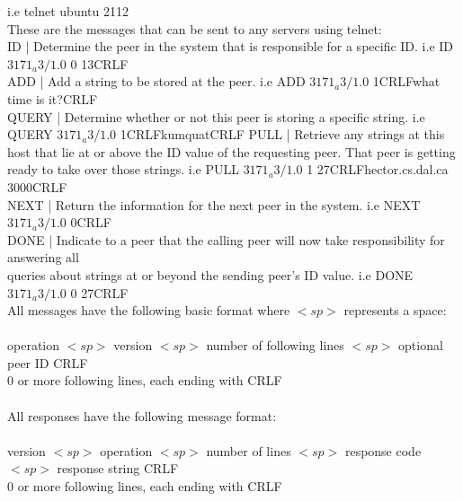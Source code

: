 \documentclass[11pt,a4paper,titlepage]{article}
\begin{document}
i.e telnet ubuntu 2112\\

These are the messages that can be sent to any servers using telnet:\\
ID | Determine the peer in the system that is responsible for a specific ID. i.e  ID $3171_a3/1.0$ 0 13CRLF\\
ADD | Add a string to be stored at the peer. i.e  ADD $3171_a3/1.0$ 1CRLFwhat time is it?CRLF\\
QUERY | Determine whether or not this peer is storing a specific string. i.e QUERY $3171_a3/1.0$ 1CRLFkumquatCRLF
PULL | Retrieve any strings at this host that lie at or above the ID value of the requesting
peer. That peer is getting ready to take over those strings. i.e PULL $3171_a3/1.0$ 1 27CRLFhector.cs.dal.ca 3000CRLF\\
NEXT | Return the information for the next peer in the system. i.e NEXT $3171_a3/1.0$ 0CRLF\\
DONE | Indicate to a peer that the calling peer will now take responsibility for answering all\\
queries about strings at or beyond the sending peer's ID value. i.e DONE $3171_a3/1.0$ 0 27CRLF\\


All messages have the following basic format where $<sp>$ represents a space: \\
\\
operation $<sp>$ version $<sp>$ number of following lines $<sp>$ optional peer ID CRLF\\
0 or more following lines, each ending with CRLF\\
\\
All responses have the following message format:\\
\\
version $<sp>$ operation $<sp>$ number of lines $<sp>$ response code $<sp>$ response string CRLF\\
0 or more following lines, each ending with CRLF\\
\end{document}
